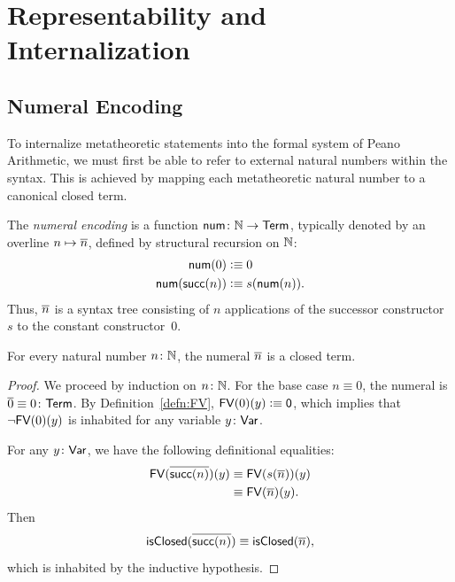 \chapter{Representability and Internalization}

\section{Numeral Encoding}

To internalize metatheoretic statements into the formal system of Peano Arithmetic, we must first be able to refer to external natural numbers within the syntax. This is achieved by mapping each metatheoretic natural number to a canonical closed term.

\begin{defn}\label{defn:numerals}
    The \textsl{numeral encoding} is a function $\fun{num}\colon\N\to\fun{Term}$, typically denoted by an overline $n\mapsto{\overline{n}}$, defined by structural recursion on $\mathbb{N}$:
    \begin{align*}
        \mathsf{num}(0)&\mathrel{\vcentcolon}\equiv 0\\
        \mathsf{num}(\mathsf{succ}(n))&\mathrel{\vcentcolon}\equiv s(\mathsf{num}(n)).
    \end{align*}
    Thus, ${\overline{n}}$ is a syntax tree consisting of $n$ applications of the successor constructor~$s$ to the constant constructor~$0$.
\end{defn}

\begin{prop}\label{prop:num-gives-closed-terms}
 For every natural number\/ $n\colon\N$, the numeral\/ ${\overline{n}}$ is a closed term.
\end{prop}

\begin{proof}
    We proceed by induction on $n\colon\N$. For the base case $n\equiv0$, the numeral is $\num{0}\equiv 0\colon\fun{Term}$. By Definition~\ref{defn:FV}, $\mathsf{FV}(0)(y)\mathrel{\vcentcolon}\equiv\mathsf{0}$, which implies that $\neg\mathsf{FV}(0)(y)$ is inhabited for any variable $y\colon\fun{Var}$.
    
    For any $y\colon\fun{Var}$, we have the following definitional equalities:
    \begin{align*}
        \mathsf{FV}({\overline{\mathsf{succ}(n)}})(y)
            &\equiv\mathsf{FV}(s({\overline{n}}))(y)\\
            &\equiv\mathsf{FV}({\overline{n}})(y).
    \end{align*}
    Then
    \[
        \mathsf{isClosed}({\overline{\mathsf{succ}(n)}})
            \equiv\mathsf{isClosed}({\overline{n}}),
    \]
    which is inhabited by the inductive hypothesis.
\end{proof}

